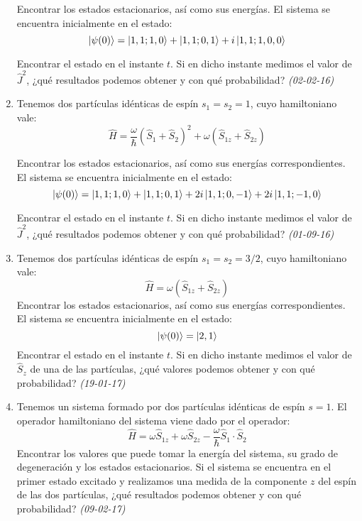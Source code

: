 \begin{enumerate}
    Encontrar los estados estacionarios, así como sus energías. El sistema se encuentra inicialmente en el estado:
    \[
    \ket{\psi (0)} = \ket{1, 1; 1, 0} + \ket{1, 1; 0, 1} + i \ket{1, 1; 1, 0, 0}
    \]
    
    Encontrar el estado en el instante \( t \). Si en dicho instante medimos el valor de \( \hat{J}^2 \), ¿qué resultados podemos obtener y con qué probabilidad? \textit{(02-02-16)}

    \item Tenemos dos partículas idénticas de espín \( s_1 = s_2 = 1 \), cuyo hamiltoniano vale:
    \[
    \hat{H} = \frac{\omega}{\hbar} \left( \hat{S}_1 + \hat{S}_2 \right)^2 + \omega \left( \hat{S}_{1z} + \hat{S}_{2z} \right)
    \]
    
    Encontrar los estados estacionarios, así como sus energías correspondientes. El sistema se encuentra inicialmente en el estado:
    \[
    \ket{\psi (0)} = \ket{1, 1; 1, 0} + \ket{1, 1; 0, 1} + 2i \ket{1, 1; 0, -1} + 2i \ket{1, 1; -1, 0}
    \]
    
    Encontrar el estado en el instante \( t \). Si en dicho instante medimos el valor de \( \hat{J}^2 \), ¿qué resultados podemos obtener y con qué probabilidad? \textit{(01-09-16)}

    \item Tenemos dos partículas idénticas de espín \( s_1 = s_2 = 3/2 \), cuyo hamiltoniano vale:
    \[
    \hat{H} = \omega \left( \hat{S}_{1z} + \hat{S}_{2z} \right)
    \]
    Encontrar los estados estacionarios, así como sus energías correspondientes. El sistema se encuentra inicialmente en el estado:
    \[
    \ket{\psi(0)} = \ket{2,1}
    \]
    Encontrar el estado en el instante \( t \). Si en dicho instante medimos el valor de \( \hat{S}_z \) de una de las partículas, ¿qué valores podemos obtener y con qué probabilidad? \textit{(19-01-17)}

    
    \item Tenemos un sistema formado por dos partículas idénticas de espín \( s = 1 \). El operador hamiltoniano del sistema viene dado por el operador:
    \[
    \hat{H} = \omega \hat{S}_{1z} + \omega \hat{S}_{2z} - \frac{\omega}{\hbar} \hat{S}_1 \cdot \hat{S}_2
    \]
    Encontrar los valores que puede tomar la energía del sistema, su grado de degeneración y los estados estacionarios. Si el sistema se encuentra en el primer estado excitado y realizamos una medida de la componente \( z \) del espín de las dos partículas, ¿qué resultados podemos obtener y con qué probabilidad? \textit{(09-02-17)}
    

\end{enumerate}
